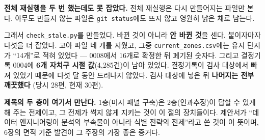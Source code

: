 \textbf{전체 재실행을 두 번 했는데도 못 잡았다.} 전체 재실행은 다시 만들어지는
파일만 본다. 아무도 만들지 않는 파일은 \texttt{git status}에도 뜨지 않고 영원히
낡은 채로 남는다.

그래서 \texttt{check\_stale.py}를 만들었다. 바뀐 것이 아니라 \textbf{안 바뀐
것}을 센다. 붙이자마자 다섯을 더 잡았다. 고아 파일 네 개를 지웠고, 그중
\texttt{current\_zones.csv}에는 유지 단지가 ``14개''로 적혀 있었다 --- 0008에서
16개로 확정한 뒤 폐기된 숫자다. 그리고 결정기록 0004에 \textbf{6개 자치구 시절
값}(4,285건)이 남아 있었다. 결정기록이 검사 대상에서 빠져 있었기 때문에 다섯 달
동안 드러나지 않았다. 검사 대상에 넣은 뒤 \textbf{나머지는 전부 깨끗했다}
(당시 28편, 현재 30편).

\textbf{제목의 두 층이 여기서 만난다.} 1층(미시 패널 구축)은 2층(인과추정)이
답할 수 있게 해 주는 전제이고, 그 전제가 썩지 않게 지키는 것이 이 절의 장치들이다.
제안서가 ``데이터 엔지니어링이 분석의 부속물이 아니라 식별 전략의 전제''라고 쓴
것이 이 뜻이며, 6장의 면적 기준 발견이 그 주장의 가장 좋은 증거다.
